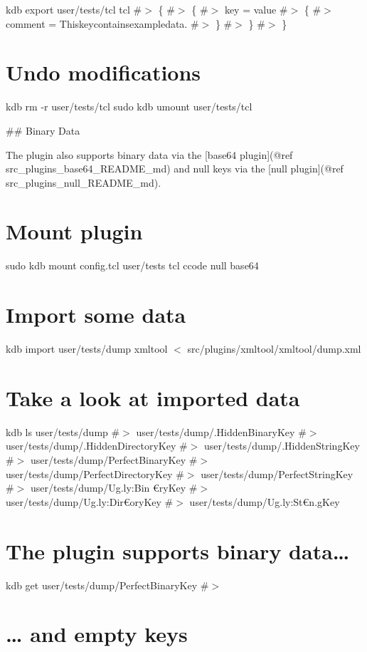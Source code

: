 kdb export user/tests/tcl tcl \#$>$ \{ \#$>$ \{ \#$>$ key = value \#$>$ \{ \#$>$ comment = Thiskeycontainsexampledata. \#$>$ \} \#$>$ \} \#$>$ \}\hypertarget{autotoc_md667_autotoc_md676}{}\section{Undo modifications}\label{autotoc_md667_autotoc_md676}
kdb rm -\/r user/tests/tcl sudo kdb umount user/tests/tcl 
\begin{DoxyCode}
## Binary Data

The plugin also supports binary data via the [base64 plugin](@ref src\_plugins\_base64\_README\_md) and null
       keys via the [null plugin](@ref src\_plugins\_null\_README\_md).
\end{DoxyCode}
 \hypertarget{autotoc_md667_autotoc_md677}{}\section{Mount plugin}\label{autotoc_md667_autotoc_md677}
sudo kdb mount config.\+tcl user/tests tcl ccode null base64\hypertarget{autotoc_md667_autotoc_md678}{}\section{Import some data}\label{autotoc_md667_autotoc_md678}
kdb import user/tests/dump xmltool $<$ src/plugins/xmltool/xmltool/dump.\+xml\hypertarget{autotoc_md667_autotoc_md679}{}\section{Take a look at imported data}\label{autotoc_md667_autotoc_md679}
kdb ls user/tests/dump \#$>$ user/tests/dump/.Hidden\+Binary\+Key \#$>$ user/tests/dump/.Hidden\+Directory\+Key \#$>$ user/tests/dump/.Hidden\+String\+Key \#$>$ user/tests/dump/\+Perfect\+Binary\+Key \#$>$ user/tests/dump/\+Perfect\+Directory\+Key \#$>$ user/tests/dump/\+Perfect\+String\+Key \#$>$ user/tests/dump/\+Ug.\+ly\+:Bin{\itshape } €ry\+Key \#$>$ user/tests/dump/\+Ug.\+ly\+:Dir€ory\+Key \#$>$ user/tests/dump/\+Ug.\+ly\+:St€n.\+g\+Key\hypertarget{autotoc_md667_autotoc_md680}{}\section{The plugin supports binary data…}\label{autotoc_md667_autotoc_md680}
kdb get user/tests/dump/\+Perfect\+Binary\+Key \#$>$ \hypertarget{autotoc_md667_autotoc_md681}{}\section{… and empty keys}\label{autotoc_md667_autotoc_md681}
